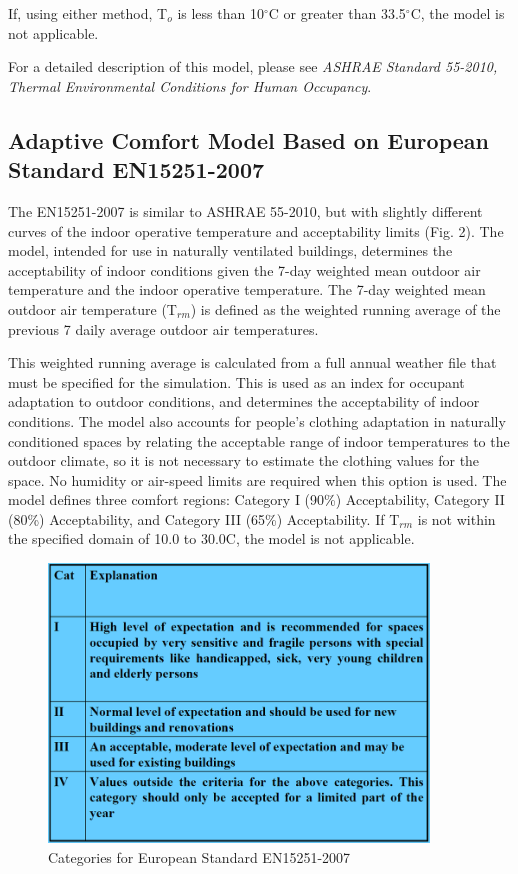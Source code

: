 If, using either method, T\(_{o}\) is less than 10\(^{\circ}\)C or greater than 33.5\(^{\circ}\)C, the model is not applicable.

For a detailed description of this model, please see \emph{ASHRAE Standard 55-2010, Thermal Environmental Conditions for Human Occupancy}.

\subsection{Adaptive Comfort Model Based on European Standard EN15251-2007}\label{adaptive-comfort-model-based-on-european-standard-en15251-2007}

The EN15251-2007 is similar to ASHRAE 55-2010, but with slightly different curves of the indoor operative temperature and acceptability limits (Fig. 2). The model, intended for use in naturally ventilated buildings, determines the acceptability of indoor conditions given the 7-day weighted mean outdoor air temperature and the indoor operative temperature. The 7-day weighted mean outdoor air temperature (T\(_{rm}\)) is defined as the weighted running average of the previous 7 daily average outdoor air temperatures.

This weighted running average is calculated from a full annual weather file that must be specified for the simulation. This is used as an index for occupant adaptation to outdoor conditions, and determines the acceptability of indoor conditions. The model also accounts for people's clothing adaptation in naturally conditioned spaces by relating the acceptable range of indoor temperatures to the outdoor climate, so it is not necessary to estimate the clothing values for the space. No humidity or air-speed limits are required when this option is used. The model defines three comfort regions: Category I (90\%) Acceptability, Category II (80\%) Acceptability, and Category III (65\%) Acceptability. If T\(_{rm}\) is not within the specified domain of 10.0 to 30.0C, the model is not applicable.

\begin{figure}[hbtp] %
\centering
\includegraphics[width=0.9\textwidth, height=0.9\textheight, keepaspectratio=true]{media/image6819.png}
\caption{Categories for European Standard EN15251-2007 \protect \label{fig:categories-for-european-standard-en15251-2007}}
\end{figure}


